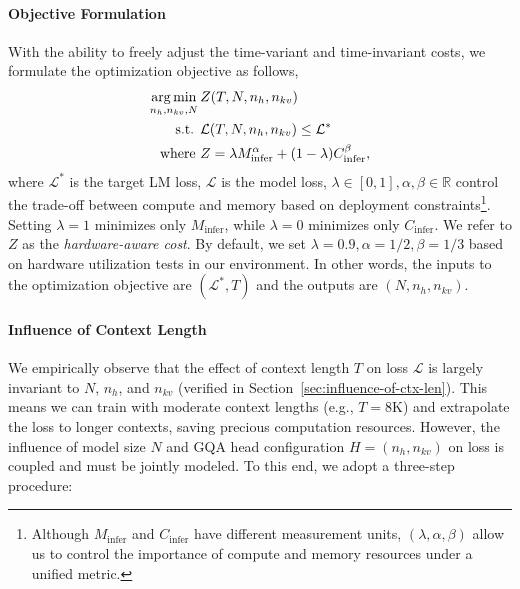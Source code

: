 
\paragraph{Objective Formulation}

With the ability to freely adjust the time-variant and time-invariant costs, we formulate the optimization objective as follows,
\begin{equation}
\begin{aligned}
\operatorname*{arg\,min}_{n_h,n_{kv},N} \, & Z(T,N,n_h,n_{kv})\\
\text{ s.t. }& \mathcal L(T, N, n_h,n_{kv}) \le \mathcal L^*\\
\text{where }& Z=\lambda M_\text{infer}^{\alpha}  + (1- \lambda) C_\text{infer}^{\beta},
\end{aligned}
\end{equation}
where $\mathcal L^*$ is the target LM loss, $\mathcal L$ is the model loss, $\lambda\in[0,1],\alpha,\beta \in\mathbb R$ control the trade-off between compute and memory based on deployment constraints\footnote{Although $M_\text{infer}$ and $C_\text{infer}$ have different measurement units, $(\lambda, \alpha, \beta)$ allow us to control the importance of compute and memory resources under a unified metric.}. Setting $\lambda = 1$ minimizes only $M_\text{infer}$, while $\lambda=0$ minimizes only $C_\text{infer}$. We refer to $Z$ as the \textit{hardware-aware cost}. By default, we set $\lambda = 0.9,\alpha=1/2, \beta=1/3$ based on hardware utilization tests in our environment. In other words, the inputs to the optimization objective are $(\mathcal L^*, T)$ and the outputs are $(N,n_h,n_{kv})$.

\paragraph{Influence of Context Length}

We empirically observe that the effect of context length $T$ on loss $\mathcal{L}$ is largely invariant to $N$, $n_h$, and $n_{kv}$ (verified in Section~\ref{sec:influence-of-ctx-len}). This means we can train with moderate context lengths (e.g., $T=8\text{K}$) and extrapolate the loss to longer contexts, saving precious computation resources. However, the influence of model size $N$ and GQA head configuration $H = (n_h, n_{kv})$ on loss is coupled and must be jointly modeled. To this end, we adopt a three-step procedure:

